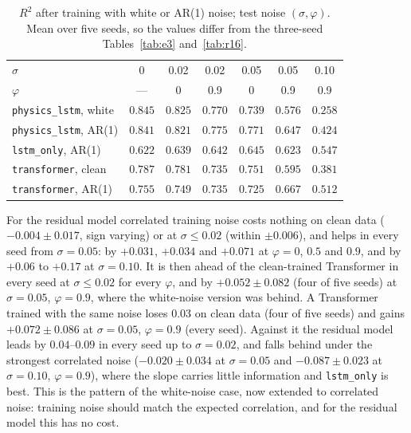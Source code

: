 \documentclass[twocolumn,10pt]{article}
\begin{document}
\begin{table}[h]
\centering
\caption{$R^2$ after training with white or AR(1) noise; test noise
  $(\sigma, \varphi)$. Mean over five seeds, so the values differ from the
  three-seed Tables~\ref{tab:e3} and~\ref{tab:r16}.\label{tab:r22}}
\footnotesize
\setlength{\tabcolsep}{2pt}
\begin{tabular}{lcccccc}
\toprule
$\sigma$ & 0 & 0.02 & 0.02 & 0.05 & 0.05 & 0.10 \\
$\varphi$ & --- & 0 & 0.9 & 0 & 0.9 & 0.9 \\
\midrule
\texttt{physics\_lstm}, white & $\mathbf{0.845}$ & $\mathbf{0.825}$ & $0.770$ & $0.739$ & $0.576$ & $0.258$ \\
\texttt{physics\_lstm}, AR(1) & $0.841$ & $0.821$ & $\mathbf{0.775}$ & $\mathbf{0.771}$ & $0.647$ & $0.424$ \\
\texttt{lstm\_only}, AR(1) & $0.622$ & $0.639$ & $0.642$ & $0.645$ & $0.623$ & $\mathbf{0.547}$ \\
\texttt{transformer}, clean & $0.787$ & $0.781$ & $0.735$ & $0.751$ & $0.595$ & $0.381$ \\
\texttt{transformer}, AR(1) & $0.755$ & $0.749$ & $0.735$ & $0.725$ & $\mathbf{0.667}$ & $0.512$ \\
\bottomrule
\end{tabular}
\end{table}

For the residual model correlated training noise costs nothing on clean
data ($-0.004 \pm 0.017$, sign varying) or at $\sigma \le 0.02$ (within
$\pm 0.006$), and helps in every seed from $\sigma = 0.05$: by $+0.031$,
$+0.034$ and $+0.071$ at $\varphi = 0$, $0.5$ and $0.9$, and by $+0.06$
to $+0.17$ at $\sigma = 0.10$.
It is then ahead of the clean-trained Transformer in every seed at
$\sigma \le 0.02$ for every $\varphi$, and by $+0.052 \pm 0.082$ (four of
five seeds) at $\sigma = 0.05$, $\varphi = 0.9$, where the white-noise
version was behind.
A Transformer trained with the same noise loses $0.03$ on clean data
(four of five seeds) and gains $+0.072 \pm 0.086$ at $\sigma = 0.05$,
$\varphi = 0.9$ (every seed). Against it the residual model leads by
$0.04$--$0.09$ in every seed up to $\sigma = 0.02$, and falls behind
under the strongest correlated noise ($-0.020 \pm 0.034$ at
$\sigma = 0.05$ and $-0.087 \pm 0.023$ at $\sigma = 0.10$, $\varphi = 0.9$),
where the slope carries little information and \texttt{lstm\_only} is
best. This is the pattern of the white-noise case, now extended to
correlated noise: training noise should match the expected correlation,
and for the residual model this has no cost.
\end{document}
